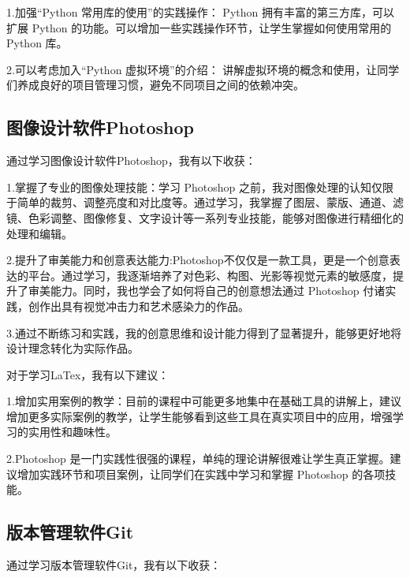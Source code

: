 \documentclass[supercite]{Experimental_Report}
\theoremstyle{definition}
\begin{document}
\par 1.加强“Python 常用库的使用”的实践操作： Python 拥有丰富的第三方库，可以扩展 Python 的功能。可以增加一些实践操作环节，让学生掌握如何使用常用的 Python 库。
\par 2.可以考虑加入“Python 虚拟环境”的介绍： 讲解虚拟环境的概念和使用，让同学们养成良好的项目管理习惯，避免不同项目之间的依赖冲突。

\subsection{图像设计软件Photoshop}
通过学习图像设计软件Photoshop，我有以下收获：
\par 1.掌握了专业的图像处理技能：学习 Photoshop 之前，我对图像处理的认知仅限于简单的裁剪、调整亮度和对比度等。通过学习，我掌握了图层、蒙版、通道、滤镜、色彩调整、图像修复、文字设计等一系列专业技能，能够对图像进行精细化的处理和编辑。
\par 2.提升了审美能力和创意表达能力:Photoshop不仅仅是一款工具，更是一个创意表达的平台。通过学习，我逐渐培养了对色彩、构图、光影等视觉元素的敏感度，提升了审美能力。同时，我也学会了如何将自己的创意想法通过 Photoshop 付诸实践，创作出具有视觉冲击力和艺术感染力的作品。
\par 3.通过不断练习和实践，我的创意思维和设计能力得到了显著提升，能够更好地将设计理念转化为实际作品。
\par 对于学习LaTex，我有以下建议：
\par 1.增加实用案例的教学：目前的课程中可能更多地集中在基础工具的讲解上，建议增加更多实际案例的教学，让学生能够看到这些工具在真实项目中的应用，增强学习的实用性和趣味性。
\par 2.Photoshop 是一门实践性很强的课程，单纯的理论讲解很难让学生真正掌握。建议增加实践环节和项目案例，让同学们在实践中学习和掌握 Photoshop 的各项技能。

\subsection{版本管理软件Git}
通过学习版本管理软件Git，我有以下收获：
\end{document}
